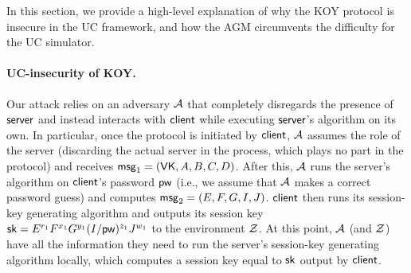 In this section, we provide a high-level explanation of why the KOY protocol is insecure in the UC framework, and how the AGM circumvents the difficulty for the UC simulator.

\paragraph{UC-insecurity of KOY.}
Our attack relies on an adversary $\mathcal{A}$ that completely disregards the presence of $\mathsf{server}$ and instead interacts with $\mathsf{client}$ while executing $\mathsf{server}$'s algorithm on its own. In particular, once the protocol is initiated by $\mathsf{client}$, $\mathcal{A}$ assumes the role of the server (discarding the actual server in the process, which plays no part in the protocol) and receives $\mathsf{msg}_{1} = (\mathsf{VK},A,B,C,D)$. After this, $\mathcal{A}$ runs the server's algorithm on $\mathsf{client}$'s password $\mathsf{pw}$ (i.e., we assume that $\mathcal{A}$ makes a correct password guess) and computes $\mathsf{msg}_{2} = (E,F,G,I,J)$. $\mathsf{client}$ then runs its session-key generating algorithm and outputs its session key $\mathsf{sk} = E^{r_1}F^{x_1}G^{y_1}(I/\mathsf{pw})^{z_1}J^{w_1}$ to the environment $\mathcal{Z}$. At this point, $\mathcal{A}$ (and $\mathcal{Z}$) have all the information they need to run the server's session-key generating algorithm locally, which computes a session key equal to $\mathsf{sk}$ output by $\mathsf{client}$.

